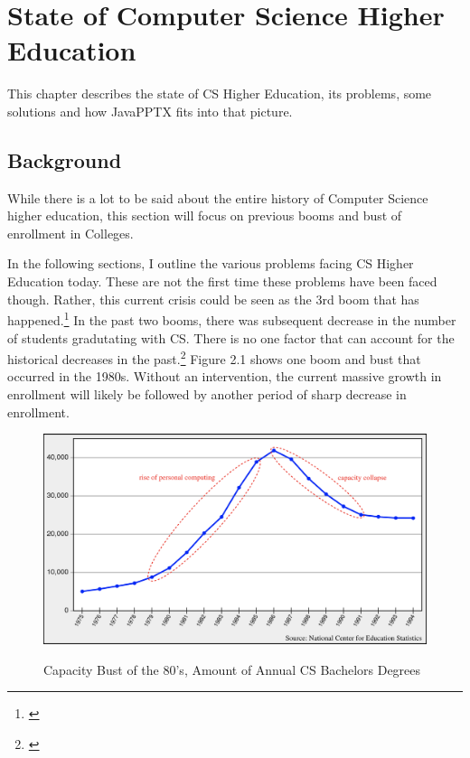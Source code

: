 \documentclass[12pt,twoside]{reedthesis}
\begin{document}
\chapter{State of Computer Science Higher Education}	
This chapter describes the state of CS Higher Education, its problems, some solutions and how JavaPPTX fits into that picture.

\section{Background}
While there is a lot to be said about the entire history of Computer Science higher education, this section will focus on previous booms and bust of enrollment in Colleges. 

In the following sections, I outline the various problems facing CS Higher Education today. These are not the first time these problems have been faced though. Rather, this current crisis could be seen as the 3rd boom that has happened.\footnote{\cite{roberts_history}} In the past two booms, there was subsequent decrease in the number of students gradutating with CS. There is no one factor that can account for the historical decreases in the past.\footnote{\cite{committee_on_the_growth_of_computer_science_undergraduate_enrollments_assessing_2018}}  Figure 2.1 shows one boom and bust that occurred in the 1980s. Without an intervention, the current massive growth in enrollment will likely be followed by another period of sharp decrease in enrollment. 
\begin{figure}[htbp] 
\begin{centering} 
\caption{Capacity Bust of the 80's, Amount of Annual CS Bachelors Degrees}
\includegraphics[scale=0.345] {computerbust}
\label{animexample}
\end{centering} 
\end{figure}
\end{document}
